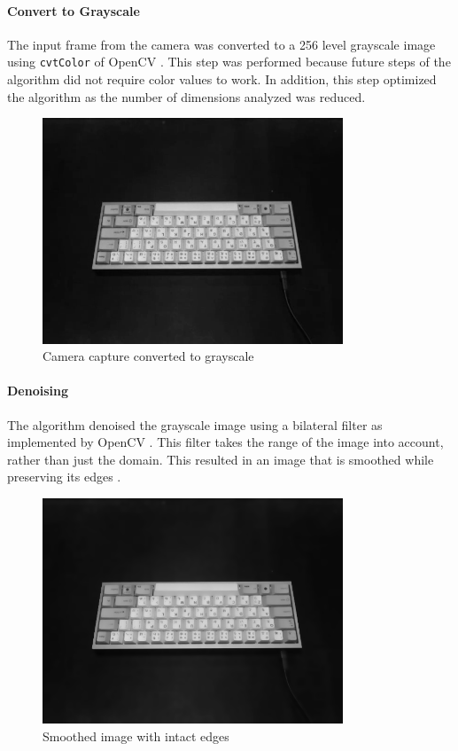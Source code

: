 \documentclass{report}
\begin{document}
\newpage

\paragraph{Convert to Grayscale}
The input frame from the camera was converted to a 256 level grayscale image
using \texttt{cvtColor} of OpenCV \parencite{opencv-cvtColor}. This step was
performed because future steps of the algorithm did not require color values to
work. In addition, this step optimized the algorithm as the number of dimensions
analyzed was reduced.

\begin{figure}[H]
	\centering
	\includegraphics[width=0.8\textwidth]{grayscale.png}
	\caption{Camera capture converted to grayscale}
	\centering
\end{figure}

\paragraph{Denoising}
The algorithm denoised the grayscale image using a bilateral filter as
implemented by OpenCV \parencite{opencv-bilateral-filter}. This filter takes the
range of the image into account, rather than just the domain. This resulted in
an image that is smoothed while preserving its edges
\parencite{bilateral-filter}.

\begin{figure}[H]
	\centering
	\includegraphics[width=0.8\textwidth]{denoised.png}
	\caption{Smoothed image with intact edges}
	\centering
\end{figure}
\end{document}
